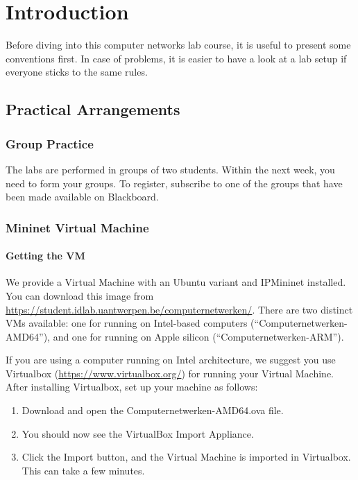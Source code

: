 
\chapter*{Introduction}

Before diving into this computer networks lab course, it is useful to present some conventions first.  In case of problems, it is easier to have a look at a lab setup if everyone sticks to the same rules.

\section{Practical Arrangements}
\subsection*{Group Practice}

The labs are performed in groups of two students. Within the next week, you need to form your groups. To register, subscribe to one of the groups that have been made available on Blackboard.

\subsection{Mininet Virtual Machine}

\subsubsection{Getting the VM}
We provide a Virtual Machine with an Ubuntu variant and IPMininet installed. You can download this image from \url{https://student.idlab.uantwerpen.be/computernetwerken/}. There are two distinct VMs available: one for running on Intel-based computers (``Computernetwerken-AMD64''), and one for running on Apple silicon (``Computernetwerken-ARM'').

If you are using a computer running on Intel architecture, we suggest you use Virtualbox (\url{https://www.virtualbox.org/}) for running your Virtual Machine. After installing Virtualbox, set up your machine as follows:
\begin{enumerate}
\item Download and open the Computernetwerken-AMD64.ova file.
\item You should now see the VirtualBox Import Appliance.
\item Click the Import button, and the Virtual Machine is imported in Virtualbox. This can take a few minutes.
\end{enumerate}

